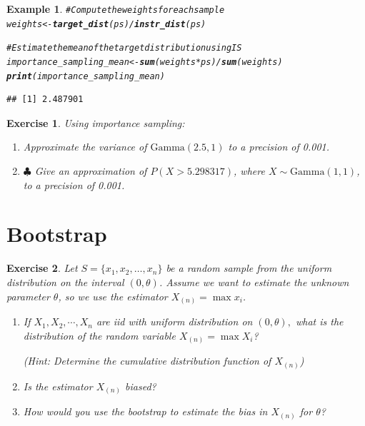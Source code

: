 \documentclass{article}\usepackage[]{graphicx}\usepackage[]{xcolor}
\makeatletter
\newcommand{\hlcom}[1]{\textcolor[rgb]{0.678,0.584,0.686}{\textit{#1}}}%
\newcommand{\hlopt}[1]{\textcolor[rgb]{0,0,0}{#1}}%
\newcommand{\hldef}[1]{\textcolor[rgb]{0.345,0.345,0.345}{#1}}%
\newcommand{\hlkwb}[1]{\textcolor[rgb]{0.69,0.353,0.396}{#1}}%
\newcommand{\hlkwd}[1]{\textcolor[rgb]{0.737,0.353,0.396}{\textbf{#1}}}%
\newenvironment{kframe}{%
 \def\at@end@of@kframe{}%
 \ifinner\ifhmode%
  \def\at@end@of@kframe{\end{minipage}}%
  \begin{minipage}{\columnwidth}%
 \fi\fi%
 \def\FrameCommand##1{\hskip\@totalleftmargin \hskip-\fboxsep
 \colorbox{shadecolor}{##1}\hskip-\fboxsep
     \hskip-\linewidth \hskip-\@totalleftmargin \hskip\columnwidth}%
 \MakeFramed {\advance\hsize-\width
   \@totalleftmargin\z@ \linewidth\hsize
   \@setminipage}}%
 {\par\unskip\endMakeFramed%
 \at@end@of@kframe}
\newenvironment{knitrout}{}{} %
\newtheorem{exercise}{Exercise}
\newtheorem{example}{Example}
\makeatother
\begin{document}
\begin{example}
\begin{knitrout}
\begin{kframe}
\begin{alltt}
\hlcom{# Compute the weights for each sample}
\hldef{weights} \hlkwb{<-} \hlkwd{target_dist}\hldef{(ps)} \hlopt{/} \hlkwd{instr_dist}\hldef{(ps)}

\hlcom{# Estimate the mean of the target distribution using IS}
\hldef{importance_sampling_mean} \hlkwb{<-} \hlkwd{sum}\hldef{(weights} \hlopt{*} \hldef{ps)} \hlopt{/} \hlkwd{sum}\hldef{(weights)}
\hlkwd{print}\hldef{(importance_sampling_mean)}
\end{alltt}
\begin{verbatim}
## [1] 2.487901
\end{verbatim}
\end{kframe}
\end{knitrout}

\end{example}

\begin{exercise}
Using importance sampling:
\begin{enumerate}
    \item Approximate the variance of $\text{Gamma}(2.5, 1)$ to a precision of 0.001.
    \item $\clubsuit$ Give an approximation of $P(X > 5.298317)$, where $X \sim \text{Gamma}(1, 1)$, to a precision of 0.001.
\end{enumerate}
\end{exercise}




\newpage
\section{Bootstrap}

\begin{exercise}
Let $S = \lbrace x_1, x_2, \ldots, x_n \rbrace$ be a random sample from the uniform distribution on the interval $(0, \theta)$. Assume we want to estimate the unknown parameter $\theta$, so we use the estimator $X_{(n)} = \max x_i$.

\begin{enumerate}
\item If $X_1,X_2,\cdots, X_n$ are iid with uniform distribution on $(0,\theta),$ what is the distribution of the random variable $X_{(n)} = \max X_i$? 

(Hint: Determine the cumulative distribution function of $X_{(n)}$)

\item Is the estimator $X_{(n)}$ biased?

\item How would you use the bootstrap to estimate the bias in $X_{(n)}$ for $\theta$?
\end{enumerate}

\end{exercise}
\end{document}
